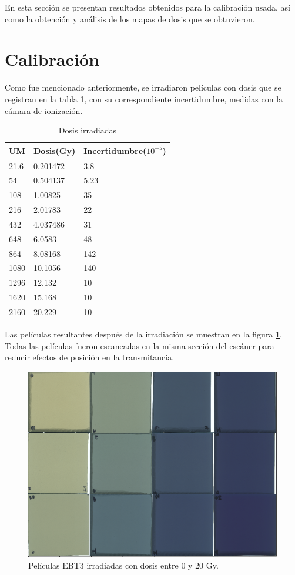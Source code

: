 En esta sección se presentan resultados obtenidos para la calibración usada, así como la obtención y análisis de los mapas de dosis que se obtuvieron.
\section{Calibración}
Como fue mencionado anteriormente, se irradiaron películas con dosis que se registran en la tabla \ref{tab:DosisIrra}, con su correspondiente incertidumbre, medidas con la cámara de ionización.\\

\begin{table}[]
	\centering
	\begin{tabular}{|l|l|l|}
		\hline
		UM& Dosis(Gy)    & Incertidumbre($10^{-5}$) \\ \hline
		21.6&0.201472 & 3.8\\ \hline
		54&0.504137 & 5.23 \\ \hline
		108&1.00825  & 35\\ \hline
		216&2.01783  & 22\\ \hline
		432&4.037486 & 31 \\ \hline
		648&6.0583   & 48\\ \hline
		864&8.08168  & 142\\ \hline
		1080&10.1056  & 140\\ \hline
		1296&12.132   & 10\\ \hline
		1620&15.168   & 10\\ \hline
		2160&20.229   & 10\\ \hline
	\end{tabular}
	\caption{Dosis irradiadas}
	\label{tab:DosisIrra}
\end{table}

Las películas resultantes después de la irradiación se muestran en la figura \ref{fig:peliculasIrradiacion}. Todas las películas fueron escaneadas en la misma sección del escáner para reducir efectos de posición en la transmitancia.\\
\begin{figure}[H]
	\centering
	\includegraphics[width=0.7\linewidth]{images/peliculasIrradiadas.png}
	\caption{Películas EBT3 irradiadas con dosis entre 0 y 20 Gy. }
	\label{fig:peliculasIrradiacion}
\end{figure}


